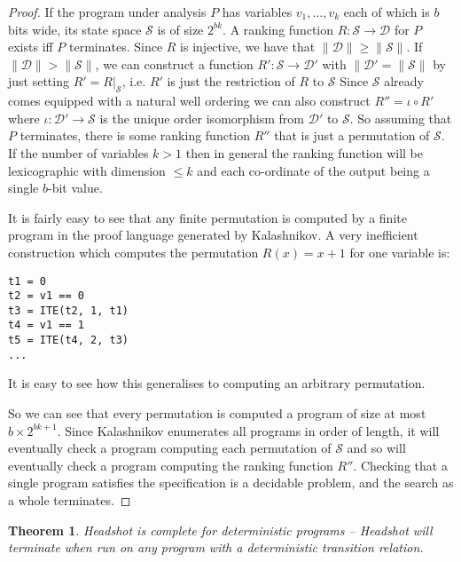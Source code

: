 \documentclass[preprint]{sigplanconf}
\newtheorem{theorem}{Theorem}
\theoremstyle{definition}
\begin{document}
\begin{proof}
 If the program under analysis $P$ has variables $v_1, \ldots, v_k$ each of which is $b$ bits wide, its state space $\mathcal{S}$ is of size $2^{bk}$.
 A ranking function $R: \mathcal{S} \to \mathcal{D}$ for $P$ exists iff $P$ terminates.  Since $R$ is injective, we have that
 $\| \mathcal{D} \| \geq \| \mathcal{S} \|$.  If $\| \mathcal{D} \| > \| \mathcal{S} \|$, we can construct a function $R': \mathcal{S} \to \mathcal{D'}$
 with $ \| \mathcal{D'} = \| \mathcal{S} \|$ by just setting $R' = R|_\mathcal{S}$, i.e. $R'$ is just the restriction of $R$ to $\mathcal{S}$
 Since $\mathcal{S}$ already comes equipped with a natural well ordering we can also construct $R'' = \iota \circ R'$
 where $\iota: \mathcal{D'} \to \mathcal{S}$ is the unique order isomorphism from $\mathcal{D'}$ to $\mathcal{S}$.
 So assuming that $P$ terminates, there is some ranking function $R''$ that is just a permutation of $\mathcal{S}$.
 If the number of variables $k > 1$ then in general the ranking function will be lexicographic with dimension $\leq k$
 and each co-ordinate of the output being a single $b$-bit value.

 It is fairly easy to see that any finite permutation is computed by a finite program in the proof language generated
 by {\sc Kalashnikov}.  A very inefficient construction which computes the permutation $R(x) = x+1$ for one variable
 is:
 \begin{verbatim}
t1 = 0
t2 = v1 == 0
t3 = ITE(t2, 1, t1)
t4 = v1 == 1
t5 = ITE(t4, 2, t3)
...
 \end{verbatim}
It is easy to see how this generalises to computing an arbitrary permutation.

So we can see that every permutation is computed a program of size at most $b \times 2^{bk + 1}$.  Since
{\sc Kalashnikov} enumerates all programs in order of length, it will eventually check
a program computing each permutation of $\mathcal{S}$ and so will eventually check a program
computing the ranking function $R''$.  Checking that a single program satisfies the specification
is a decidable problem, and the search as a whole terminates.
\end{proof}

\begin{theorem}
 {\sc Headshot} is complete for deterministic programs -- {\sc Headshot} will terminate when run on
 any program with a deterministic transition relation.
\end{theorem}
\end{document}

